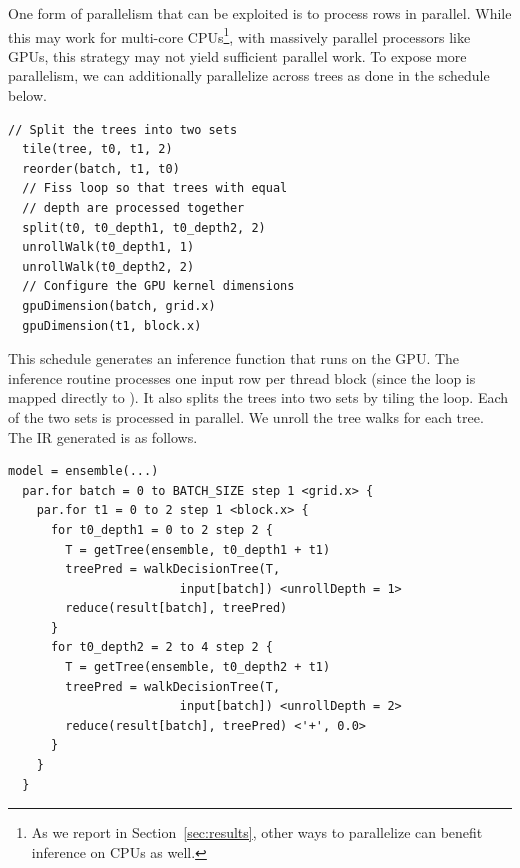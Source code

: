 One form of parallelism that can be exploited is to process rows in 
parallel. 
While this may work for multi-core CPUs\footnote{As we report in Section~\ref{sec:results}, other ways to parallelize can benefit inference on CPUs as well.}, with massively parallel processors like GPUs,
 this strategy may not yield sufficient parallel work. To expose more parallelism, 
we can additionally parallelize across trees as done in the schedule below. 
\begin{lstlisting}[style=c++]
  // Split the trees into two sets
  tile(tree, t0, t1, 2)
  reorder(batch, t1, t0)
  // Fiss loop so that trees with equal 
  // depth are processed together
  split(t0, t0_depth1, t0_depth2, 2)
  unrollWalk(t0_depth1, 1)
  unrollWalk(t0_depth2, 2)
  // Configure the GPU kernel dimensions
  gpuDimension(batch, grid.x)
  gpuDimension(t1, block.x)
\end{lstlisting}
This schedule generates an inference function that runs on the GPU. 
The inference routine processes one input row per thread block (since the 
loop is mapped directly to ).
It also splits the trees into two sets by tiling the  loop.
Each of the two sets is processed in parallel. We unroll the tree walks 
for each tree. The IR generated is as follows. 
\begin{lstlisting}[style=c++]
  model = ensemble(...)
  par.for batch = 0 to BATCH_SIZE step 1 <grid.x> {
    par.for t1 = 0 to 2 step 1 <block.x> {
      for t0_depth1 = 0 to 2 step 2 {
        T = getTree(ensemble, t0_depth1 + t1)
        treePred = walkDecisionTree(T, 
                        input[batch]) <unrollDepth = 1>
        reduce(result[batch], treePred)
      }
      for t0_depth2 = 2 to 4 step 2 {
        T = getTree(ensemble, t0_depth2 + t1)
        treePred = walkDecisionTree(T,
                        input[batch]) <unrollDepth = 2>
        reduce(result[batch], treePred) <'+', 0.0>
      }
    }
  }
\end{lstlisting}

